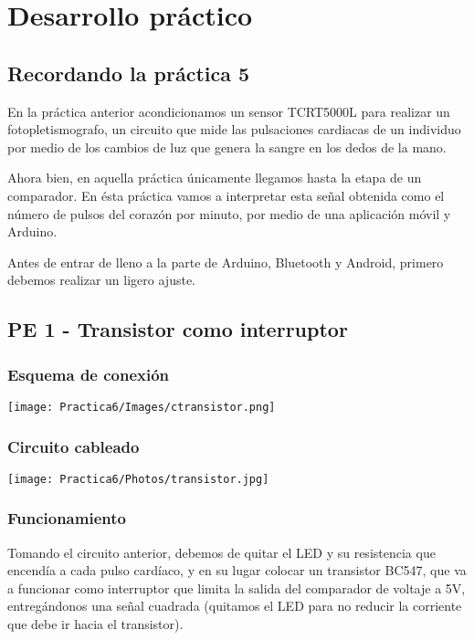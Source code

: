 \documentclass[12pt]{article}
\begin{document}
    \section{Desarrollo práctico}
    \subsection{Recordando la práctica 5}
    En la práctica anterior acondicionamos un sensor TCRT5000L para realizar un fotopletismografo, un circuito que mide las pulsaciones cardiacas de un individuo por medio de los cambios de luz que genera la sangre en los dedos de la mano.
    
    Ahora bien, en aquella práctica únicamente llegamos hasta la etapa de un comparador. En ésta práctica vamos a interpretar esta señal obtenida como el número de pulsos del corazón por minuto, por medio de una aplicación móvil y Arduino.
    
    Antes de entrar de lleno a la parte de Arduino, Bluetooth y Android, primero debemos realizar un ligero ajuste.
    
    \subsection{PE 1 - Transistor como interruptor}
    
    \begin{multicols}{2}
            \subsubsection{Esquema de conexión}

                \texttt{[image: Practica6/Images/ctransistor.png]}

        \columnbreak
            \subsubsection{Circuito cableado}

                \texttt{[image: Practica6/Photos/transistor.jpg]}

            \end{multicols}
    
    \subsubsection{Funcionamiento}
    Tomando el circuito anterior, debemos de quitar el LED y su resistencia que encendía a cada pulso cardíaco, y en su lugar colocar un transistor BC547, que va a funcionar como interruptor que limita la salida del comparador de voltaje a 5V, entregándonos una señal cuadrada (quitamos el LED para no reducir la corriente que debe ir hacia el transistor). 
    
\end{document}

